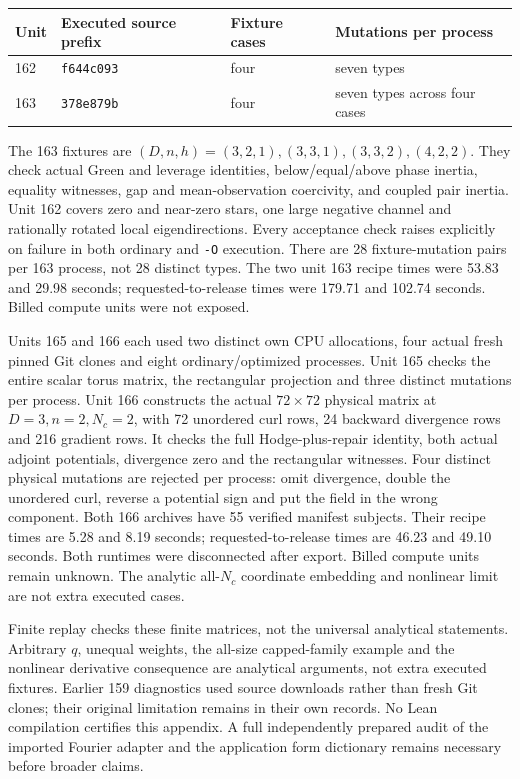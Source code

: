\documentclass[11pt,a4paper]{article}
\begin{document}
\begin{center}\small
\begin{tabular}{llll}
\toprule
Unit & Executed source prefix & Fixture cases & Mutations per process\\
\midrule
162 & \texttt{f644c093} & four & seven types\\
163 & \texttt{378e879b} & four & seven types across four cases\\
\bottomrule
\end{tabular}
\end{center}
The 163 fixtures are $(D,n,h)=(3,2,1),(3,3,1),(3,3,2),(4,2,2)$.
They check actual Green and leverage identities, below/equal/above phase
inertia, equality witnesses, gap and mean-observation coercivity, and coupled
pair inertia. Unit 162 covers zero and near-zero stars, one large negative
channel and rationally rotated local eigendirections. Every acceptance check
raises explicitly on failure in both ordinary and \texttt{-O} execution.
There are 28 fixture-mutation pairs per 163 process, not 28 distinct types.
The two unit 163 recipe times were 53.83 and 29.98 seconds; requested-to-release
times were 179.71 and 102.74 seconds. Billed compute units were not exposed.

Units 165 and 166 each used two distinct own CPU allocations, four actual
fresh pinned Git clones and eight ordinary/optimized processes. Unit 165
checks the entire scalar torus matrix, the rectangular projection and three
distinct mutations per process. Unit 166 constructs the actual $72\times72$
physical matrix at $D=3,n=2,N_c=2$, with 72 unordered curl rows, 24 backward
divergence rows and 216 gradient rows. It checks the full Hodge-plus-repair
identity, both actual adjoint potentials, divergence zero and the rectangular
witnesses. Four distinct physical mutations are rejected per process: omit
divergence, double the unordered curl, reverse a potential sign and put the
field in the wrong component. Both 166 archives have 55 verified manifest
subjects. Their recipe times are 5.28 and 8.19 seconds; requested-to-release
times are 46.23 and 49.10 seconds. Both runtimes were disconnected after
export. Billed compute units remain unknown. The analytic all-$N_c$ coordinate
embedding and nonlinear limit are not extra executed cases.

Finite replay checks these finite matrices, not the universal analytical
statements. Arbitrary $q$, unequal weights, the all-size capped-family example
and the nonlinear derivative consequence are analytical arguments, not extra
executed fixtures. Earlier 159 diagnostics used source downloads rather than
fresh Git clones; their original limitation remains in their own records.
No Lean compilation certifies this appendix. A full independently prepared
audit of the imported Fourier adapter and the application form dictionary
remains necessary before broader claims.
\end{document}
